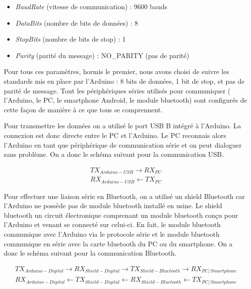 \documentclass{polytech/polytech}
\begin{document}
\begin{itemize}
\item \textit{BaudRate} (vitesse de communication) : 9600 bauds
\item \textit{DataBits} (nombre de bits de données) : 8
\item \textit{StopBits} (nombre de bits de stop) : 1
\item \textit{Parity} (parité du message) : NO\_PARITY (pas de parité)
\end{itemize}

Pour tous ces paramètres, hormis le premier, nous avons choisi de suivre les standards mis en place par l'Arduino : 8 bits de données, 1 bit de stop, et pas de parité de message.
Tout les périphériques séries utilisés pour communiquer ( l'Arduino, le PC, le smartphone Android, le module bluetooth) sont configurés de cette façon de manière à ce que tous se comprennent.

Pour transmettre les données on a utilisé le port USB B intégré à l'Arduino. La connexion est donc directe entre le PC et l'Arduino. Le PC reconnais alors l'Arduino en tant que périphérique de communication série et on peut dialoguer sans problème. On a donc le schéma suivant pour la communication USB.

\begin{eqnarray}
TX_{Arduino-USB} \rightarrow RX_{PC}  \\
RX_{Arduino-USB}  \leftarrow TX_{PC}
\end{eqnarray}

Pour effectuer une liaison série en Bluetooth, on a utilisé un shield Bluetooth car l'Arduino ne possède pas de module bluetooth installé en usine. Le shield bluetooth un circuit électronique comprenant un module bluetooth conçu pour l'Arduino et venant se connecté sur celui-ci. En fait, le module bluetooth communique avec l'Arduino via le protocole série et le module bluetooth communique en série avec la carte bluetooth du PC ou du smartphone. On a donc le schéma suivant pour la communication Bluetooth.

\begin{eqnarray}
TX_{Arduino-Digital} \rightarrow RX_{Shield-Digital} \rightarrow TX_{Shield-Bluetooth} \rightarrow RX_{PC/Smartphone}  \\
RX_{Arduino-Digital} \leftarrow TX_{Shield-Digital} \leftarrow RX_{Shield-Bluetooth} \leftarrow TX_{PC/Smartphone}
\end{eqnarray}
\end{document}
